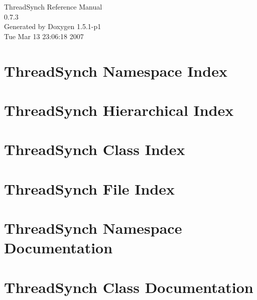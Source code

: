 \documentclass[a4paper]{book}
\begin{document}
\begin{titlepage}
\vspace*{7cm}
\begin{center}
{\Large Thread\-Synch Reference Manual\\[1ex]\large 0.7.3 }\\
\vspace*{1cm}
{\large Generated by Doxygen 1.5.1-p1}\\
\vspace*{0.5cm}
{\small Tue Mar 13 23:06:18 2007}\\
\end{center}
\end{titlepage}
\clearemptydoublepage
{}
\tableofcontents
\clearemptydoublepage
{}
\chapter{Thread\-Synch Namespace Index}

\chapter{Thread\-Synch Hierarchical Index}

\chapter{Thread\-Synch Class Index}

\chapter{Thread\-Synch File Index}

\chapter{Thread\-Synch Namespace Documentation}



\chapter{Thread\-Synch Class Documentation}


















\end{document}
